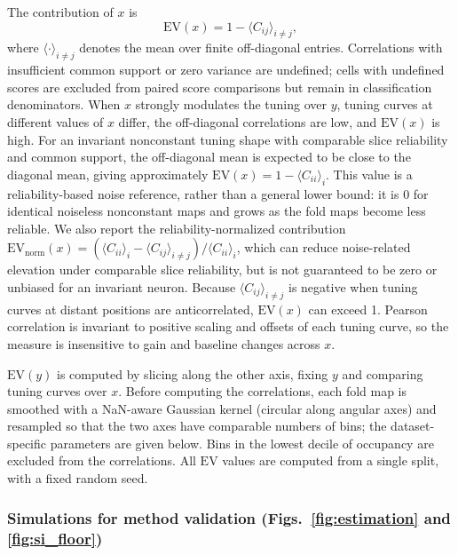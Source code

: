 \documentclass[11pt]{article}
\begin{document}
The contribution of $x$ is
\begin{equation}
\mathrm{EV}(x) = 1 - \langle C_{ij} \rangle_{i \neq j},
\label{eq:2}
\end{equation}
where $\langle \cdot \rangle_{i \neq j}$ denotes the mean over finite off-diagonal entries. Correlations with insufficient common support or zero variance are undefined; cells with undefined scores are excluded from paired score comparisons but remain in classification denominators. When $x$ strongly modulates the tuning over $y$, tuning curves at different values of $x$ differ, the off-diagonal correlations are low, and $\mathrm{EV}(x)$ is high. For an invariant nonconstant tuning shape with comparable slice reliability and common support, the off-diagonal mean is expected to be close to the diagonal mean, giving approximately $\mathrm{EV}(x) = 1-\langle C_{ii} \rangle_i$. This value is a reliability-based noise reference, rather than a general lower bound: it is 0 for identical noiseless nonconstant maps and grows as the fold maps become less reliable. We also report the reliability-normalized contribution $\mathrm{EV}_{\mathrm{norm}}(x)=(\langle C_{ii}\rangle_i-\langle C_{ij}\rangle_{i\neq j})/\langle C_{ii}\rangle_i$, which can reduce noise-related elevation under comparable slice reliability, but is not guaranteed to be zero or unbiased for an invariant neuron. Because $\langle C_{ij}\rangle_{i\neq j}$ is negative when tuning curves at distant positions are anticorrelated, $\mathrm{EV}(x)$ can exceed 1. Pearson correlation is invariant to positive scaling and offsets of each tuning curve, so the measure is insensitive to gain and baseline changes across $x$.

$\mathrm{EV}(y)$ is computed by slicing along the other axis, fixing $y$ and comparing tuning curves over $x$. Before computing the correlations, each fold map is smoothed with a NaN-aware Gaussian kernel (circular along angular axes) and resampled so that the two axes have comparable numbers of bins; the dataset-specific parameters are given below. Bins in the lowest decile of occupancy are excluded from the correlations. All $\mathrm{EV}$ values are computed from a single split, with a fixed random seed.

\subsubsection*{Simulations for method validation (Figs.~\ref{fig:estimation} and \ref{fig:si_floor})}
\end{document}
